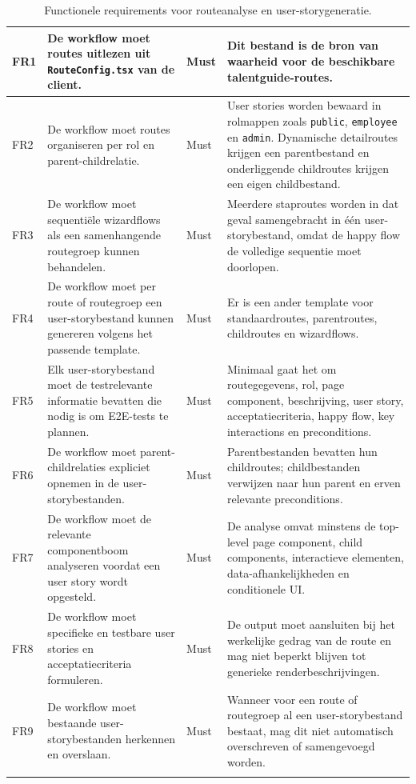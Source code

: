 \begin{longtable}{p{}p{}p{}p{}}
    FR1 & De workflow moet routes uitlezen uit \texttt{RouteConfig.tsx} van de client. & Must & Dit bestand is de bron van waarheid voor de beschikbare talentguide-routes. \\
    \midrule
    FR2 & De workflow moet routes organiseren per rol en parent-childrelatie. & Must & User stories worden bewaard in rolmappen zoals \texttt{public}, \texttt{employee} en \texttt{admin}. Dynamische detailroutes krijgen een parentbestand en onderliggende childroutes krijgen een eigen childbestand. \\
    \midrule
    FR3 & De workflow moet sequentiële wizardflows als een samenhangende routegroep kunnen behandelen. & Must & Meerdere staproutes worden in dat geval samengebracht in één user-storybestand, omdat de happy flow de volledige sequentie moet doorlopen. \\
    \midrule
    FR4 & De workflow moet per route of routegroep een user-storybestand kunnen genereren volgens het passende template. & Must & Er is een ander template voor standaardroutes, parentroutes, childroutes en wizardflows. \\
    \midrule
    FR5 & Elk user-storybestand moet de testrelevante informatie bevatten die nodig is om E2E-tests te plannen. & Must & Minimaal gaat het om routegegevens, rol, page component, beschrijving, user story, acceptatiecriteria, happy flow, key interactions en preconditions. \\
    \midrule
    FR6 & De workflow moet parent-childrelaties expliciet opnemen in de user-storybestanden. & Must & Parentbestanden bevatten hun childroutes; childbestanden verwijzen naar hun parent en erven relevante preconditions. \\
    \midrule
    FR7 & De workflow moet de relevante componentboom analyseren voordat een user story wordt opgesteld. & Must & De analyse omvat minstens de top-level page component, child components, interactieve elementen, data-afhankelijkheden en conditionele UI. \\
    \midrule
    FR8 & De workflow moet specifieke en testbare user stories en acceptatiecriteria formuleren. & Must & De output moet aansluiten bij het werkelijke gedrag van de route en mag niet beperkt blijven tot generieke renderbeschrijvingen. \\
    \midrule
    FR9 & De workflow moet bestaande user-storybestanden herkennen en overslaan. & Must & Wanneer voor een route of routegroep al een user-storybestand bestaat, mag dit niet automatisch overschreven of samengevoegd worden. \\
    
    \bottomrule
    \caption[Functionele requirements voor routeanalyse en user-storygeneratie]{Functionele requirements voor routeanalyse en user-storygeneratie.}
    \label{tab:fr-routeanalyse-userstories}
    \endlastfoot
\end{longtable}


